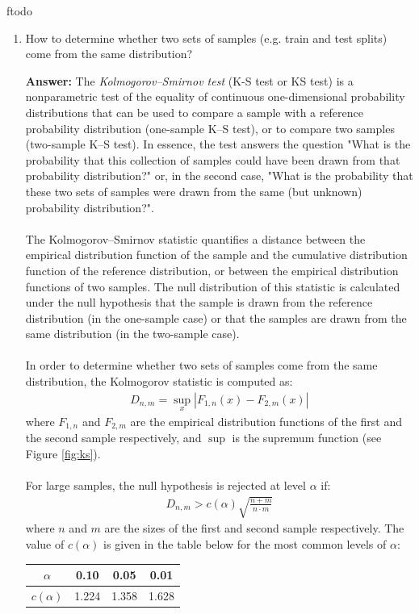 ƒtodo\documentclass{article}
\newenvironment{QandA}{\begin{enumerate}[label=\arabic*.]}{\end{enumerate}}
\newenvironment{answer}{\par\normalfont \textbf{Answer:}}{}
\begin{document}
\begin{QandA}
    \item How to determine whether two sets of samples (e.g. train and test splits) come from the same distribution?
    \begin{answer}
        The \textit{Kolmogorov–Smirnov test} (K-S test or KS test) is a nonparametric test of the equality of continuous one-dimensional probability distributions that can be used to compare a sample with a reference probability distribution (one-sample K–S test), or to compare two samples (two-sample K–S test). In essence, the test answers the question "What is the probability that this collection of samples could have been drawn from that probability distribution?" or, in the second case, "What is the probability that these two sets of samples were drawn from the same (but unknown) probability distribution?". \\\\
        The Kolmogorov–Smirnov statistic quantifies a distance between the empirical distribution function of the sample and the cumulative distribution function of the reference distribution, or between the empirical distribution functions of two samples. The null distribution of this statistic is calculated under the null hypothesis that the sample is drawn from the reference distribution (in the one-sample case) or that the samples are drawn from the same distribution (in the two-sample case). \\\\
        In order to determine whether two sets of samples come from the same distribution, the Kolmogorov statistic is computed as:
        \begin{align*}
            D_{n, m} = \sup_x \left \vert F_{1,n}(x) - F_{2, m}(x)  \right \vert
        \end{align*}
        where $F_{1, n}$ and $F_{2, m}$ are the empirical distribution functions of the first and the second sample respectively, and $\sup$ is the supremum function (see Figure \ref{fig:ks}).\\\\
        For large samples, the null hypothesis is rejected at level $\alpha$ if:
        \begin{align*}
            D_{n, m} > c(\alpha) \sqrt{\frac{n + m}{n \cdot m}}
        \end{align*}
        where $n$ and $m$ are the sizes of the first and second sample respectively. The value of $c(\alpha)$ is given in the table below for the most common levels of $\alpha$:
        \begin{table}[htb!]
        \centering
        \begin{tabular}{|c|c|c|c|}
        \hline
        \textbf{$\alpha$}    & 0.10  & 0.05  & 0.01  \\ \hline
        \textbf{$c(\alpha)$} & 1.224 & 1.358 & 1.628 \\ \hline
        \end{tabular}
        \end{table}


\end{answer}
\end{QandA}
\end{document}
